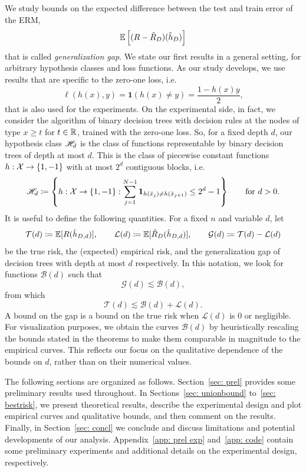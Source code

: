 \documentclass[reqno]{amsart}
\begin{document}
We study bounds on the expected difference between the test and train error of the ERM,
\begin{equation}\label{eq: gen gap}
\mathbb{E}\left[(R - \hat R_D)(\hat h_D)\right]
\end{equation}
that is called {\it generalization gap}. We state our first results in a general setting, for arbitrary hypothesis classes and loss functions. As our study develops, we use results that are specific to the zero-one loss, i.e.\
\begin{equation}\label{eq: counting loss}
    \ell(h(x),y) = \mathbf{1} (h(x)\neq y) = \frac{1 - h(x)y}{2},
\end{equation}
that is also used for the experiments. 
On the experimental side, in fact, we consider the algorithm of binary decision trees with decision rules at the nodes of type $x\ge t$ for $t\in\mathbb{R}$, trained with the zero-one loss. So, for a fixed depth $d$, our hypothesis class $\mathscr{H}_d$ is the class of functions representable by binary decision trees of depth at most $d$. This is the class of piecewise constant functions $h:\mathcal{X} \to \{1,-1\}$ with at most $2^d$ contiguous blocks, i.e.
\begin{equation}\label{eq: def trees}
\mathscr{H}_d \coloneq \left\{ h:\mathcal{X} \to \{1,-1\} : \sum_{j=1}^{N-1} \mathbf{1}_{h(\bar x_j) \neq h(\bar x_{j+1})} \le 2^{d}-1 \right\} \qquad \text{for } d>0.
\end{equation} 
It is useful to define the following quantities. For a fixed $n$ and variable $d$, let
\[
\mathcal T(d) \coloneq \mathbb{E}[R(\hat h_{D,d})], \qquad \mathcal L(d) \coloneq \mathbb{E}[\hat R_D(\hat h_{D,d})], \qquad \mathcal G(d)\coloneq \mathcal T(d)-\mathcal L(d)
\]
be the true risk, the (expected) empirical risk, and the generalization gap of decision trees with depth at most $d$ respectively. In this notation, we look for functions $\mathcal B(d)$ such that 
\[
\mathcal G(d) \lesssim \mathcal B(d),
\]
from which 
\[
\mathcal T(d) \lesssim \mathcal B(d) + \mathcal L(d).
\]
A bound on the gap is a bound on the true risk when $\mathcal L(d)$ is $0$ or negligible. For visualization purposes, we obtain the curves $\mathcal B(d)$ by heuristically rescaling the bounds stated in the theorems to make them comparable in magnitude to the empirical curves. This reflects our focus on the qualitative dependence of the bounds on $d$, rather than on their numerical values.

The following sections are organized as follows. Section~\ref{sec: prel} provides some preliminary results used throughout. In Sections~\ref{sec: unionbound} to~\ref{sec: bestrisk}, we present theoretical results, describe the experimental design and plot empirical curves and qualitative bounds, and then comment on the results. Finally, in Section~\ref{sec: concl} we conclude and discuss limitations and potential developments of our analysis. 
Appendix~\ref{app: prel exp} and~\ref{app: code} contain some preliminary experiments and additional details on the experimental design, respectively.
\end{document}
